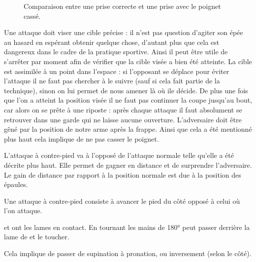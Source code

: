 \begin{figure}[ht]
	\centering
	\hspace{3cm}
	\caption{Comparaison entre une prise correcte et une prise avec le poignet cassé.}
	\label{attdef:fig:poignet-cassé}
\end{figure}


Une attaque doit viser une cible précise : il n'est pas question d'agiter son épée au hasard en espérant obtenir quelque chose, d'autant plus que cela est dangereux dans le cadre de la pratique sportive.
Ainsi il peut être utile de s'arrêter par moment afin de vérifier que la cible visée a bien été atteinte.
La cible est assimilée à un point dans l'espace : si l'opposant se déplace pour éviter l'attaque il ne faut pas chercher à le suivre (sauf si cela fait partie de la technique), sinon on lui permet de nous amener là où ile décide.
De plus une fois que l'on a atteint la position visée il ne faut pas continuer la coupe jusqu'au bout, car alors on se prête à une riposte : après chaque attaque il faut absolument se retrouver dans une garde qui ne laisse aucune ouverture.
L'adversaire doit être gêné par la position de notre arme après la frappe.
Ainsi que cela a été mentionné plus haut cela implique de ne pas casser le poignet.


L'attaque à contre-pied va à l'opposé de l'attaque normale telle qu'elle a été décrite plus haut.
Elle permet de gagner en distance et de surprendre l'adversaire.
Le gain de distance par rapport à la position normale est due à la position des épaules.

\begin{coup}
\label{struct:coup:contre-pied}

Une attaque à contre-pied consiste à avancer le pied du côté opposé à celui où l'on attaque.
\end{coup}


\begin{technique}
\label{struct:tech:changement-ligne}

\A et \D ont les lames en contact.
En tournant les mains de 180° \A peut passer derrière la lame de \D et le toucher.

Cela implique de passer de supination à pronation, ou inversement (selon le côté).

\end{technique}


